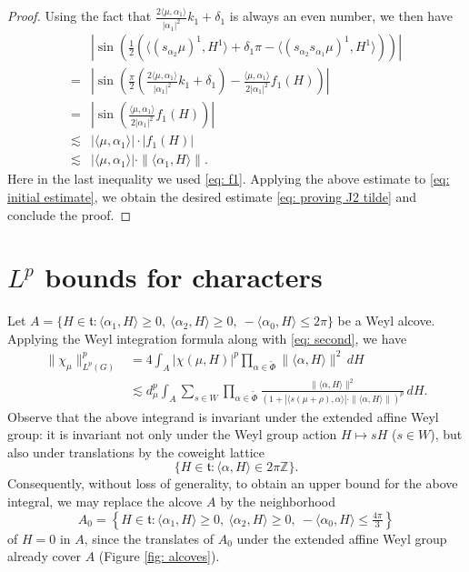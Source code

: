 \documentclass{amsart}
\numberwithin{equation}{section}
\numberwithin{equation}{section}
\begin{document}
\begin{proof}
Using the fact that  $\frac{2\langle\mu,\alpha_1\rangle}{|\alpha_1|^2}k_1+{\delta_1}$ is always an even number, we then have 
\begin{align*}
   &\left|\sin\left(\frac12(\langle(s_{\alpha_2}\mu)^1,H^1\rangle+{\delta_1}\pi-\langle (s_{\alpha_2}s_{\alpha_1}\mu)^1,H^1\rangle)\right)\right|\\
   =&\left|\sin\left(\frac{\pi}{2}\left(\frac{2\langle\mu,\alpha_1\rangle}{|\alpha_1|^2}k_1+{\delta_1}\right)-\frac{\langle\mu,\alpha_1\rangle}{2|\alpha_1|^2}f_1(H)\right)\right|\\
   =&\left|\sin\left(\frac{\langle\mu,\alpha_1\rangle}{2|\alpha_1|^2}f_1(H)\right)\right|\\
   \lesssim& |\langle\mu,\alpha_1\rangle|\cdot |f_1(H)|\\
   \lesssim &|\langle\mu,\alpha_1\rangle|\cdot  \|\langle\alpha_1,H\rangle\|.
\end{align*}
Here in the last inequality we used \eqref{eq: f1}.
Applying the above estimate to \eqref{eq: initial estimate}, we obtain the desired estimate \eqref{eq: proving J2 tilde} and conclude the proof.  
    \end{proof}







\section{$L^p$ bounds for characters}\label{sec: Lp}
Let $A=\{H\in\mathfrak{t}: \langle\alpha_1,H\rangle\geq 0,\ \langle\alpha_2,H\rangle\geq 0,\ -\langle\alpha_0,H\rangle\leq 2\pi\}$ be a Weyl alcove. 
Applying the Weyl integration formula \cite{Wey39} along with \eqref{eq: second}, we have 
\begin{align}\label{eq: chi Lp first}
    \|\chi_\mu\|_{L^p(G)}^p
   &=4\int_A |\chi(\mu,H)|^p \prod_{\alpha\in\widetilde{\Phi}}\|\langle\alpha,H\rangle\|^2\,dH \nonumber\\
   &\lesssim d_\mu^p\int_A \sum_{s\in W}\prod_{\alpha\in\widetilde{\Phi}}
   \frac{\|\langle\alpha,H\rangle\|^2}{(1+|\langle s(\mu+\rho),\alpha\rangle|\cdot\|\langle\alpha, H\rangle\|)^{p}}
   \,dH.
\end{align}
Observe that the above integrand is invariant under the extended affine Weyl group: it is invariant not only under the Weyl group action \(H \mapsto sH\) (\(s \in W\)), but also under translations by the coweight lattice
\[
\{ H \in \mathfrak{t} : \langle \alpha, H \rangle \in 2\pi \mathbb{Z} \}.
\]
Consequently, without loss of generality, to obtain an upper bound for the above integral, we may replace the alcove $A$ by the neighborhood
\[
A_0 = \left\{ H \in \mathfrak{t} : \langle \alpha_1, H \rangle \geq 0,\ \langle \alpha_2, H \rangle \geq 0,\ -\langle \alpha_0, H \rangle \leq \tfrac{4\pi}{3} \right\}
\]
of $H=0$ in $A$, since the translates of $A_0$ under the extended affine Weyl group already cover $A$ (Figure \ref{fig: alcoves}). 
\end{document}
